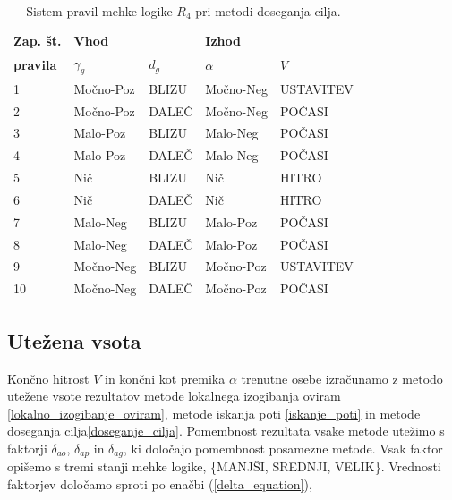 \documentclass[9pt]{pnas-new}
\begin{document}
\begin{table}[]
\centering
\begin{tabular}{|l|ll|ll|}
\hline
\textbf{Zap. št.} & \multicolumn{2}{l|}{\textbf{Vhod}} & \multicolumn{2}{l|}{\textbf{Izhod}} \\ \cline{2-5} 
\textbf{pravila} & ${\gamma_{g}}$          & ${d_g}$          & ${\alpha}$           & $V$         \\ \hline
1                            & Močno-Poz  & BLIZU & Močno-Neg  & USTAVITEV  \\ \hline
2                            & Močno-Poz & DALEČ & Močno-Neg   &  POČASI           \\ \hline
3                            & Malo-Poz &  BLIZU &   Malo-Neg   &  POČASI   \\ \hline
4                            & Malo-Poz & DALEČ &  Malo-Neg  &  POČASI   \\ \hline
5                            & Nič      &  BLIZU &  Nič    &   HITRO    \\ \hline
6                            & Nič      & DALEČ  &  Nič    &   HITRO  \\ \hline
7                            & Malo-Neg & BLIZU & Malo-Poz    &  POČASI   \\ \hline
8                            & Malo-Neg & DALEČ & Malo-Poz   &  POČASI    \\ \hline
9                            & Močno-Neg & BLIZU &  Močno-Poz   & USTAVITEV \\ \hline
10                           & Močno-Neg & DALEČ  &  Močno-Poz   &  POČASI   \\ \hline
\end{tabular}
\caption{Sistem pravil mehke logike $R_4$ pri metodi doseganja cilja.}
\label{rules_goal_seeking_behaviour}
\end{table}

\subsection*{Utežena vsota}
Končno hitrost $V$ in končni kot premika ${\alpha}$ trenutne osebe izračunamo z metodo utežene vsote rezultatov metode lokalnega izogibanja oviram \ref{lokalno_izogibanje_oviram}, metode iskanja poti \ref{iskanje_poti} in metode doseganja cilja\ref{doseganje_cilja}. Pomembnost rezultata vsake metode utežimo s faktorji ${\delta_{ao}}$, ${\delta_{ap}}$ in ${\delta_{ag}}$, ki določajo pomembnost posamezne metode. Vsak faktor opišemo s tremi stanji mehke logike, \{MANJŠI, SREDNJI, VELIK\}. Vrednosti faktorjev določamo sproti po enačbi (\ref{delta_equation}),
\end{document}
